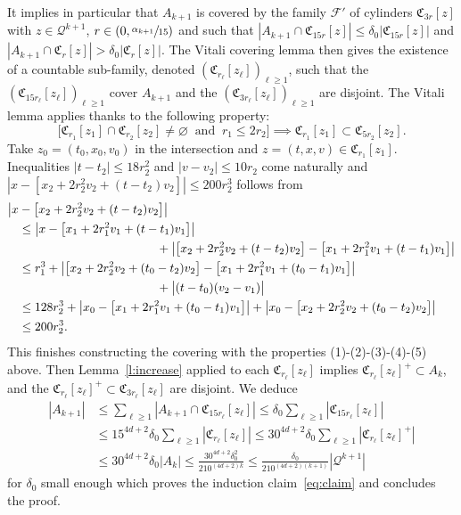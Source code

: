 \documentclass[JEP,XML,SOM,Unicode,NoFloatCountersInSection,published]{cedram}
\let\mathcal\mathscr
\theoremstyle{definition}
\theoremstyle{remark}
\newcommand{\cQ}{\mathcal Q}
\begin{document}
It implies in particular that $A_{k+1}$ is covered by the family
$\mathcal F'$ of cylinders $\mathfrak C_{3r}[z]$ with $z \in \cQ^{k+1}$,
$r \in (0,\sfrac{\alpha_{k+1}}{15})$ and such that
$|A_{k+1} \cap \mathfrak C_{15r}[z]| \le \delta_0 |\mathfrak C_{15
r}[z]|$ and
$|A_{k+1} \cap \mathfrak C_{r}[z]| > \delta_0 |\mathfrak
C_{r}[z]|$. The Vitali covering lemma then gives the existence of
a countable sub-family, denoted
$(\mathfrak C_{r_\ell}[z_\ell])_{\ell \ge 1}$, such that the
$(\mathfrak C_{15 r_\ell}[z_\ell])_{\ell \ge 1}$ cover $A_{k+1}$
and the $(\mathfrak C_{3 r_\ell}[z_\ell])_{\ell \ge 1}$ are
disjoint. The Vitali lemma applies thanks to the following
property:
\begin{equation*}
\Big[ \mathfrak C_{r_1}[z_1] \cap \mathfrak C_{r_2}[z_2] \neq
\varnothing \ \mbox{ and } \ r_1\le 2r_2 \Big] \implies \mathfrak C_{r_1}[z_1] \subset
\mathfrak C_{5r_2}[z_2].
\end{equation*}
Take $z_0=(t_0,x_0,v_0)$ in the intersection and
$z=(t,x,v)\in \mathfrak C_{r_1}[z_1]$. Inequalities
$|t-t_2|\leq 18 r_2^2$ and $|v-v_2|\leq 10r_2$ come naturally and
$|x-[x_2+2 r_2^2v_2 +(t-t_2)v_2]| \le 200r_2^3$ follows from
\begin{align*}
\big| x&- \big[ x_2+ 2r_2^2v_2 + (t-t_2)v_2 \big] \big| \\
&\le \big| x- \big[ x_1+ 2r_1^2v_1 + (t-t_1)v_1 \big] \big|\\
&\hspace*{4cm} +
\big| \big[ x_2+ 2r_2^2v_2 + (t-t_2)v_2 \big] - \big[ x_1+
2r_1^2v_1 + (t-t_1)v_1 \big] \big| \\
& \le r_1^3 + \big| \big[ x_2+ 2r_2^2v_2 + (t_0-t_2)v_2 \big] -
\big[ x_1+ 2r_1^2v_1 + (t_0-t_1)v_1 \big] \big|\\
&\hspace*{4cm} + \big|
(t-t_0)(v_2-v_1) \big| \\
& \le 128 r_2^3 + \big| x_0- \big[ x_1+ 2r_1^2v_1 +
(t_0-t_1)v_1 \big] \big| + \big| x_0- \big[ x_2+ 2r_2^2v_2 +
(t_0-t_2)v_2 \big] \big|\\
&\le 200 r_2^3.
\end{align*}
This finishes constructing the covering with the properties
(1)-(2)-(3)-(4)-(5) above. Then Lemma~\ref{l:increase} applied to
each $\mathfrak C_{r_\ell}[z_\ell]$ implies
$\mathfrak C_{r_\ell}[z_\ell]^+ \subset A_k$, and the
$\mathfrak C_{r_\ell}[z_\ell]^+ \subset \mathfrak C_{3
r_\ell}[z_\ell]$ are disjoint. We deduce
\begin{align*}
|A_{k+1}|
& \le \sum_{\ell \ge 1} |A_{k+1} \cap \mathfrak C_{15
r_\ell}[z_\ell]| \le \delta_0 \sum_{\ell \ge 1}
|\mathfrak C_{15 r_\ell}[z_\ell]| \\
& \le 15^{4d+2} \delta_0 \sum_{\ell \ge 1} |\mathfrak
C_{r_\ell}[z_\ell]| \le 30^{4d+2} \delta_0 \sum_{\ell \ge 1}
|\mathfrak C_{r_\ell}[z_\ell]^+| \\
& \le 30^{4d+2} \delta_0 |A_k|
\le \frac{30^{4d+2}\delta_0^2}{210^{(4d+2)k}}
\le \frac{\delta_0}{210^{(4d+2)(k+1)}} \left| \cQ^{k+1}
\right|
\end{align*}
for $\delta_0$ small enough which proves the induction
claim~\eqref{eq:claim} and concludes the proof.
\end{document}
